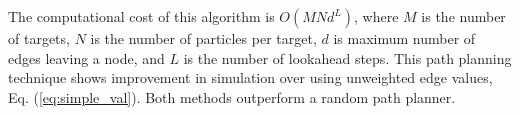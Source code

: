 \documentclass[letterpaper, 10 pt, conference]{ieeeconf}  %
\begin{document}



The computational cost of this algorithm is $O(MNd^L)$, where $M$ is the number of targets, $N$ is the number of particles per target, $d$ is maximum number of edges leaving a node, and $L$ is the number of lookahead steps. This path planning technique shows improvement in simulation over using unweighted edge values, Eq. (\ref{eq:simple_val}). Both methods outperform a random path planner.
\end{document}
